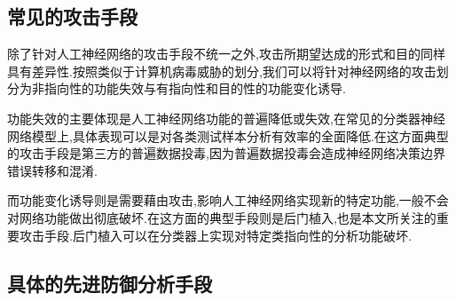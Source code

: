 \subsection{常见的攻击手段}
除了针对人工神经网络的攻击手段不统一之外,攻击所期望达成的形式和目的同样具有差异性.按照类似于计算机病毒威胁的划分,我们可以将针对神经网络的攻击划分为非指向性的功能失效与有指向性和目的性的功能变化诱导.

功能失效的主要体现是人工神经网络功能的普遍降低或失效,在常见的分类器神经网络模型上,具体表现可以是对各类测试样本分析有效率的全面降低.在这方面典型的攻击手段是第三方的普遍数据投毒,因为普遍数据投毒会造成神经网络决策边界错误转移和混淆.

而功能变化诱导则是需要藉由攻击,影响人工神经网络实现新的特定功能,一般不会对网络功能做出彻底破坏.在这方面的典型手段则是后门植入,也是本文所关注的重要攻击手段.后门植入可以在分类器上实现对特定类指向性的分析功能破坏.

\subsection{具体的先进防御分析手段}

